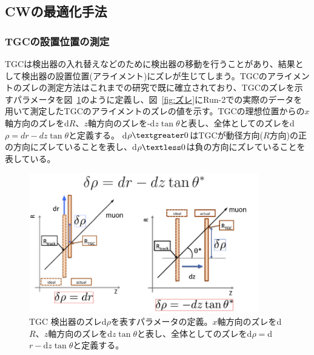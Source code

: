 \subsection{CWの最適化手法}
\subsubsection{TGCの設置位置の測定}\label{ズレ}
TGCは検出器の入れ替えなどのために検出器の移動を行うことがあり、結果として検出器の設置位置(アライメント)にズレが生じてしまう。TGCのアライメントのズレの測定方法はこれまでの研究\cite{article:sano-mron}で既に確立されており、TGCのズレを示すパラメータを図~\ref{fig:dr_para}のように定義し、図~\ref{fig:ズレ}にRun-2での実際のデータを用いて測定したTGCのアライメントのズレの値を示す。TGCの理想位置からの$x$軸方向のズレをd$R$、$z$軸方向のズレを-d$z\tan\theta$と表し、全体としてのズレをd$\rho = dr-dz\tan\theta$と定義する。
d$\rho \textgreater 0$はTGCが動径方向($R$方向)の正の方向にズレていることを表し、d$\rho \textless 0$は負の方向にズレていることを表している。
\begin{figure}[tb]
  \centering
  \includegraphics[clip, width=10cm]{fig/3/drho_param_position_measurement.png}
  \caption{TGC 検出器のズレd$\rho$を表すパラメータの定義\cite{article:yamauti-mron}。$x$軸方向のズレをd$R$、$z$軸方向のズレをd$z\tan\theta$と表し、全体としてのズレをd$\rho = $d$r-$d$z\tan\theta$と定義する。}
  \label{fig:dr_para}
\end{figure}

